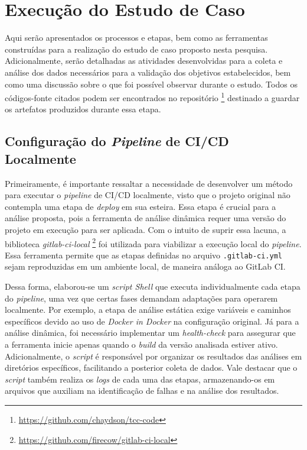 \chapter[Execução do Estudo de Caso]{Execução do Estudo de Caso}
\label{chap:execucao-estudo-caso}

Aqui serão apresentados os processos e etapas, bem como as ferramentas construídas para a realização do estudo de caso proposto nesta pesquisa. Adicionalmente, serão detalhadas as atividades desenvolvidas para a coleta e análise dos dados necessários para a validação dos objetivos estabelecidos, bem como uma discussão sobre o que foi possível observar durante o estudo. Todos os códigos-fonte citados podem ser encontrados no repositório \footnote{\href{https://github.com/chaydson/tcc-code}{https://github.com/chaydson/tcc-code}} destinado a guardar os artefatos produzidos durante essa etapa.

\section{Configuração do \textit{Pipeline} de CI/CD Localmente}

Primeiramente, é importante ressaltar a necessidade de desenvolver um método para executar o \textit{pipeline} de CI/CD localmente, visto que o projeto original não contempla uma etapa de \textit{deploy} em sua esteira. Essa etapa é crucial para a análise proposta, pois a ferramenta de análise dinâmica requer uma versão do projeto em execução para ser aplicada.  Com o intuito de suprir essa lacuna, a biblioteca \textit{gitlab-ci-local} \footnote{\href{https://github.com/firecow/gitlab-ci-local}{https://github.com/firecow/gitlab-ci-local}} foi utilizada para viabilizar a execução local do \textit{pipeline}. Essa ferramenta permite que as etapas definidas no arquivo \texttt{.gitlab-ci.yml} sejam reproduzidas em um ambiente local, de maneira análoga ao GitLab CI.

Dessa forma, elaborou-se um \textit{script Shell} que executa individualmente cada etapa do \textit{pipeline}, uma vez que certas fases demandam adaptações para operarem localmente. Por exemplo, a etapa de análise estática exige variáveis e caminhos específicos devido ao uso de \textit{Docker in Docker} na configuração original. Já para a análise dinâmica, foi necessário implementar um \textit{health-check} para assegurar que a ferramenta inicie apenas quando o \textit{build} da versão analisada estiver ativo. Adicionalmente, o \textit{script} é responsável por organizar os resultados das análises em diretórios específicos, facilitando a posterior coleta de dados. Vale destacar que o \textit{script} também realiza os \textit{logs} de cada uma das etapas, armazenando-os em arquivos que auxiliam na identificação de falhas e na análise dos resultados.

